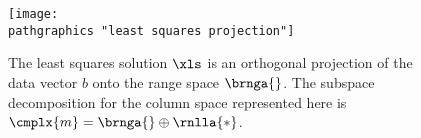 \begin{figure}[t]
	\texttt{[image: \\pathgraphics "least squares projection"]}
	\caption{The least squares solution $\xls$ is an orthogonal projection of the data vector $b$ onto the range space $\brnga{}$. The subspace decomposition for the column space represented here is $\cmplx{m}=\brnga{}\oplus\rnlla{*}$.}
	\label{fig:projection onto range}
\end{figure}

\endinput  %